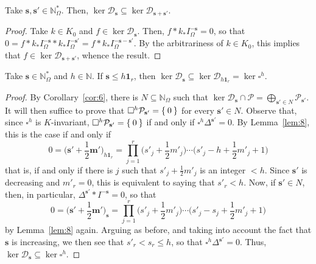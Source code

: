 \documentclass[10.5pt,reqno]{amsart}
\newcommand{\vect}[1]{\mathbf{{#1}}}
\newcommand{\N}{\mathds{N}}
\newcommand{\Dc}{\mathcal{D}}
\newcommand{\Pc}{\mathcal{P}}
\newcommand{\meg}{\leqslant}
\begin{document}
\begin{prop}\label{prop:10}
	Take $\vect s,\vect s'\in \N_{\Omega}^*$. Then, $\ker \Dc_{\vect s}\subseteq \ker \Dc_{\vect s+\vect s'}$.
\end{prop}

\begin{proof}
	Take $k\in K_0$ and $f\in \ker \Dc_{\vect s}$. Then, $f*k_* I^{-\vect s}_\Omega=0$, so that $0=f*k_* I^{-\vect s}_\Omega*k_* I^{-\vect s'}_\Omega=f*k_* I^{-\vect s-\vect s'}_\Omega$. By the arbitrariness of $k\in K_0$, this implies that $f\in \ker \Dc_{\vect s+\vect s'}$, whence the result.
\end{proof}


\begin{prop}\label{prop:7}
	Take $\vect s\in \N_\Omega^*$ and $h\in \N$. If  $\vect s \meg h\vect 1_r$, then $\ker \Dc_{\vect s}\subseteq \ker \Dc_{h\vect 1_r}=\ker \square^h$.  
\end{prop}

\begin{proof} 
	By Corollary~\ref{cor:6}, there is $N\subseteq \N_{\Omega}$ such that $\ker \Dc_{\vect s}\cap \Pc=\bigoplus_{\vect s'\in N} \Pc_{\vect s'}$. It  will then suffice to prove that $\square^h \Pc_{\vect s'}=\Set{0}$ for every $\vect s'\in N$. Observe that, since $\square^h$ is $K$-invariant, $\square^h\Pc_{\vect s'}=\Set{0}$  if and only if $\square^h\Delta^{\vect s'}=0$. By Lemma~\ref{lem:8}, this is the case if and only if
	\[
	0=\Big(\vect s'+\frac 1 2 \vect m'\Big)_{h\vect 1_r}=\prod_{j=1}^r \Big(s'_j+\frac 1 2 m'_j\Big)\cdots \Big(s'_j-h+\frac 1 2 m'_j+1\Big)
	\] 
	that is, if and only if there is $j$ such that $s'_j+\frac 1 2 m'_j$ is an integer $<h$. Since $\vect s'$ is decreasing and $m'_r=0$, this is equivalent to saying that $s'_r<h$. Now, if $\vect s'\in N$, then, in particular, $\Delta^{\vect s'} *I^{-\vect s} =0$, so that 
	\[
	0=\Big(\vect s'+\frac 1 2 \vect m'\Big)_{\vect s}=\prod_{j=1}^r \Big(s'_j+\frac 1 2 m'_j\Big)\cdots \Big(s'_j-s_j+\frac 1 2 m'_j+1\Big)
	\] 
	by Lemma~\ref{lem:8} again. Arguing as before, and taking into account the fact that $\vect s$ is increasing, we then see that $s'_r<s_r\meg h$, so that $\square^h \Delta^{\vect s'}=0$. Thus, $\ker \Dc_{\vect s}\subseteq \ker \square^h$. 
\end{proof}
\end{document}
